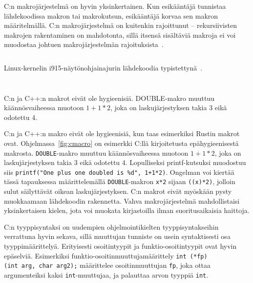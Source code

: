 C:n makrojärjestelmä on hyvin yksinkertainen. Kun esikääntäjä tunnistaa
lähdekoodissa makron tai makrokutsun, esikääntäjä korvaa sen makron
määritelmällä. C:n makrojärjestelmä on kuitenkin rajoittunut -- rekursiivisten
makrojen rakentaminen on mahdotonta, sillä itsensä sisältäviä makroja ei voi
muodostaa johtuen makrojärjestelmän rajoituksista~\citep[luku 6.10.3.4]{C18}.

\FloatBarrier

\begin{listing}[ht!]
    \inputminted{C}{c-error-handling.c}
    \caption{Linux-kernelin i915-näytönohjainajurin lähdekoodia
    typistettynä~\citep[\texttt{drivers/gpu/drm/i915/i915\_perf.c}, funktio
    \texttt{i915\_oa\_stream\_init}]{i915debugfs}.}
    \label{fig:cerrorhandling}
\end{listing}

\FloatBarrier

\FloatBarrier

\begin{listing}[ht!]
    \inputminted{C}{c-hygiene.c}
    \inputminted{text}{c-hygiene-output.txt}
    \caption{C:n ja C++:n makrot eivät ole hygieenisiä. DOUBLE-makro muuttuu
    käännösvaiheessa muotoon $1+1*2$, joka on laskujärjestyksen takia 3 eikä
    odotettu 4.}
    \label{fig:cmacro}
\end{listing}

\FloatBarrier

C:n ja C++:n makro eivät ole hygieenisiä, kun taas esimerkiksi Rustin makrot
ovat. Ohjelmassa~\ref{fig:cmacro} on esimerkki C:llä kirjoitetusta
epähygieenisestä makrosta. \texttt{DOUBLE}-makro muuttuu käännösvaiheessa
muotoon $1+1*2$, joka on laskujärjestyksen takia 3 eikä odotettu 4.
Lopulliseksi printf-kutsuksi muodostuu siis \texttt{printf("One plus one
doubled is \%d", 1+1*2)}. Ongelman voi kiertää tässä tapauksessa
määrittelemällä \texttt{DOUBLE}-makron \texttt{x*2} sijaan \texttt{((x)*2)},
jolloin sulut säilyttävät oikean laskujärjestyksen. C:n makrot eivät myöskään
pysty muokkaamaan lähdekoodin rakennetta. Vahva makrojärjestelmä mahdollistaisi
yksinkertaisen kielen, jota voi muokata kirjastoilla ilman suoritusaikaisia
haittoja.

C:n tyyppisyntaksi on uudempien ohjelmointikielten tyyppisyntakseihin
verrattuna hyvin sekava, sillä muuttujan tunniste on usein syntaktisesti osa
tyyppimäärittelyä. Erityisesti osoitintyypit ja funktio-osoitintyypit ovat
hyvin epäselviä. Esimerkiksi funktio-osoitinmuuttujamäärittely
\texttt{int~(*fp)(int~arg,~char~arg2);} määrittelee osoitinmuuttujan
\texttt{fp}, joka ottaa argumenteiksi kaksi \texttt{int}-muuttujaa, ja
palauttaa arvon tyyppiä \texttt{int}.

